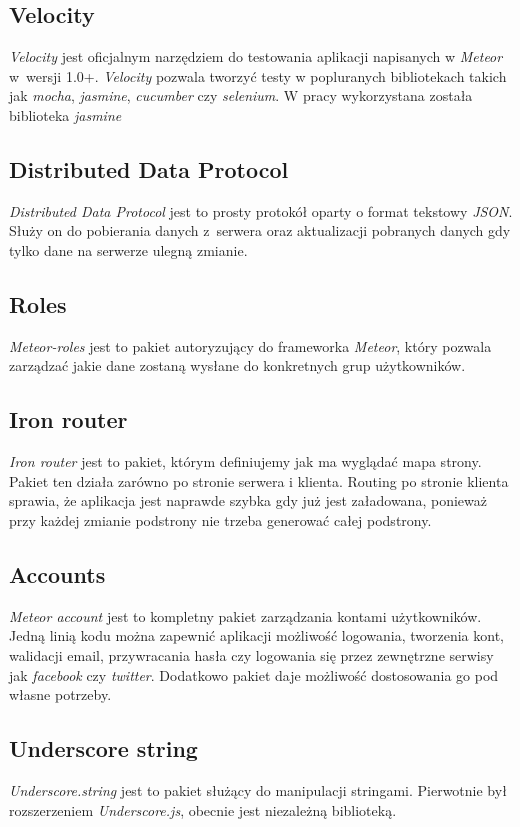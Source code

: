 \documentclass{xmgr}
\begin{document}
\subsection{Velocity}
\textit{Velocity} jest oficjalnym narzędziem do testowania aplikacji napisanych w \textit{Meteor} w~wersji 1.0+. \textit{Velocity} pozwala tworzyć testy w popluranych bibliotekach takich jak \textit{mocha}, \textit{jasmine}, \textit{cucumber} czy \textit{selenium}. W pracy wykorzystana została biblioteka \textit{jasmine}
\subsection{Distributed Data Protocol}
\textit{Distributed Data Protocol} jest to prosty protokół oparty o format tekstowy \textit{JSON}. Służy on do pobierania danych z~serwera oraz aktualizacji pobranych danych gdy tylko dane na serwerze ulegną zmianie.
\subsection{Roles}
\textit{Meteor-roles} jest to pakiet autoryzujący do frameworka \textit{Meteor}, który pozwala zarządzać jakie dane zostaną wysłane do konkretnych grup użytkowników.
\subsection{Iron router}
\textit{Iron router} jest to pakiet, którym definiujemy jak ma wyglądać mapa strony. Pakiet ten działa zarówno po stronie serwera i klienta. Routing po stronie klienta sprawia, że aplikacja jest naprawde szybka gdy już jest załadowana, ponieważ przy każdej zmianie podstrony nie trzeba generować całej podstrony.
\subsection{Accounts}
\textit{Meteor account} jest to kompletny pakiet zarządzania kontami użytkowników. Jedną linią kodu można  zapewnić aplikacji możliwość logowania, tworzenia kont, walidacji email, przywracania hasła czy logowania się przez zewnętrzne serwisy jak \textit{facebook} czy \textit{twitter}. Dodatkowo pakiet daje możliwość dostosowania go pod własne potrzeby.
\subsection{Underscore string}
\textit{Underscore.string} jest to pakiet służący do manipulacji stringami. Pierwotnie był rozszerzeniem \textit{Underscore.js}, obecnie jest niezależną biblioteką.
\end{document}
